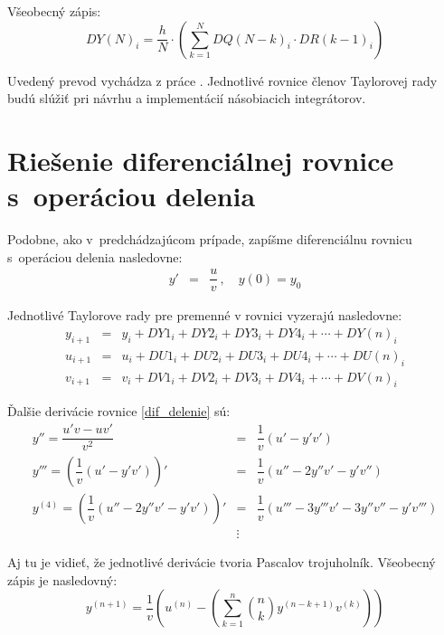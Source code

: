 Všeobecný zápis:
\begin{equation}
DY(N)_{i} = \dfrac{h}{N} \cdot \left( \sum_{k=1}^N DQ(N-k)_{i} \cdot DR(k-1)_{i} \right) \nonumber
\end{equation}

Uvedený prevod vychádza z práce \cite{ZavadaBP}. Jednotlivé rovnice členov Taylorovej rady budú slúžiť pri návrhu a implementácií násobiacich integrátorov.


\section{Riešenie diferenciálnej rovnice s~operáciou delenia}
Podobne, ako v~predchádzajúcom prípade, zapíšme diferenciálnu rovnicu s~operáciou delenia nasledovne:
\begin{eqnarray}
y' & = & \dfrac{u}{v} \, , \quad y(0) = y_{0} \label{dif_delenie}
\end{eqnarray}



Jednotlivé Taylorove rady pre premenné v rovnici vyzerajú nasledovne:
\begin{eqnarray}
y_{i + 1} & = & y_{i} + DY1_{i} + DY2_{i} + DY3_{i} + DY4_{i} + \cdots + DY(n)_{i}\\
u_{i+1} & = & u_i + DU1_i + DU2_i + DU3_i + DU4_i + \cdots + DU(n)_i\\
v_{i+1} & = & v_i + DV1_i + DV2_i + DV3_i + DV4_i + \cdots + DV(n)_i
\end{eqnarray}



Ďalšie derivácie rovnice \eqref{dif_delenie} sú:
\begin{eqnarray}
y'' = \dfrac{u'v - uv'}{v^{2}} & = & \dfrac{1}{v} (u' - y'v') \label{derivacie_delenie} \\
y''' = \left( \dfrac{1}{v} (u' - y'v') \right)' & = & \dfrac{1}{v} (u'' - 2y''v' - y'v'') \nonumber \\
y^{(4)} = \left( \dfrac{1}{v} (u'' - 2y''v' - y'v') \right)' & = & \dfrac{1}{v} (u''' - 3y'''v' - 3y''v'' - y'v''') \nonumber \\
 & \vdots \nonumber &
\end{eqnarray}

Aj tu je vidieť, že jednotlivé derivácie tvoria Pascalov trojuholník. Všeobecný zápis je nasledovný:
\begin{equation}
y^{(n+1)} = \dfrac{1}{v} \left( u^{(n)} - \left( \sum_{k=1}^n \binom{n}{k} y^{(n-k+1)} v^{(k)} \right) \right) \nonumber
\end{equation}
\bigskip

